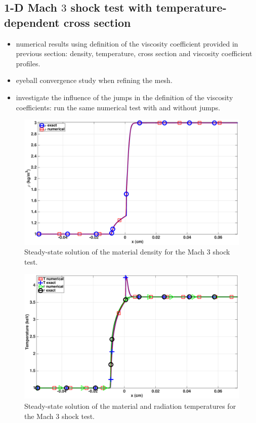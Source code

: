 \documentclass[review]{elsarticle}
\begin{document}
\subsection{1-D Mach $3$ shock test with temperature-dependent cross section}
%
\begin{itemize}
\item numerical results using definition of the viscosity coefficient provided in previous section: density, temperature, cross section and viscosity coefficient profiles.
\item eyeball convergence study when refining the mesh.
\item investigate the influence of the jumps in the definition of the viscosity coefficients: run the same numerical test with and without jumps.
\end{itemize}
%
\begin{figure}[H]
    \centering
    \includegraphics[width=\textwidth]{figures/dpt-xs/mach_3_nel_1000_density.eps}
    \caption{Steady-state solution of the material density for the Mach 3 shock test.}\label{fig:mach-3-dpt-xs-dens}
\end{figure}
%
\begin{figure}[H]
    \centering
    \includegraphics[width=\textwidth]{figures/dpt-xs/mach_3_nel_1000_temperature.eps}
    \caption{Steady-state solution of the material and radiation temperatures for the Mach 3 shock test.}\label{fig:mach-3-dpt-xs-temp}
\end{figure}
\end{document}
